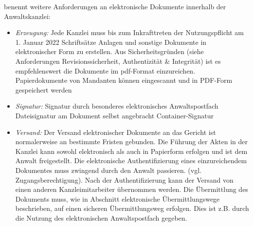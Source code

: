 \textcite{rechtsvekehranwaltskanzlei} benennt weitere Anforderungen an elektronische Dokumente innerhalb der Anwaltskanzlei:
\begin{itemize}
\item \textit{Erzeugung:}
Jede Kanzlei muss bis zum Inkrafttreten der Nutzungspflicht am 1. Januar 2022 Schriftsätze Anlagen und sonstige Dokumente in elektronischer Form zu erstellen. Aus Sicherheitsgründen (siehe Anforderungen Revisionssicherheit, Authentizität \& Integrität) ist es empfehlenswert die Dokumente im pdf-Format einzureichen.  Papierdokumente von Mandanten können eingescannt und in PDF-Form gespeichert werden
\item \textit{Signatur:}
Signatur durch besonderes elektronisches Anwaltspostfach
Dateisignatur am Dokument selbst angebracht
Container-Signatur
\item \textit{Versand:}
Der Versand elektronischer Dokumente an das Gericht ist normalerweise an bestimmte Fristen gebunden.
Die Führung der Akten in der Kanzlei kann sowohl elektronisch als auch in Papierform erfolgen und ist dem Anwalt freigestellt. Die elektronische Authentifizierung eines einzureichendem Dokumentes muss zwingend durch den Anwalt passieren. (vgl. Zugangsberechtigung). Nach der Authentifizierung kann der Versand von einen anderen Kanzleimitarbeiter übernommen werden. Die Übermittlung des Dokuments muss, wie in Abschnitt elektronische Übermittlungswege beschrieben, auf einen sicheren Übermittlungsweg erfolgen. Dies ist z.B. durch die Nutzung des elektronischen Anwaltspostfach gegeben.
\end{itemize}
	  

